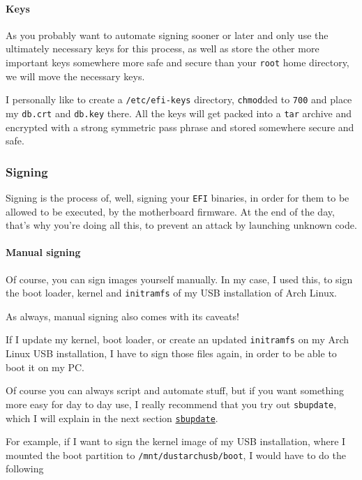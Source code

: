 \documentclass[9pt]{report}
\newenvironment{NOTE}
{\begin{tcolorbox}[colback=admonitionBG,coltitle=draculaFG,colframe=draculaBlue,colbacktitle=draculaBlue,title=NOTE]}
{\end{tcolorbox}}
\begin{document}
\newpage

\hypertarget{x-keys}{\paragraph{Keys}}
As you probably want to automate signing sooner or later and only use the ultimately necessary keys for this process, as well as store the other more important keys somewhere more safe and secure than your \texttt{root} home directory, we will move the necessary keys.


I personally like to create a \texttt{/etc/efi-keys} directory, \texttt{chmod}ded to \texttt{700} and place my \texttt{db.crt} and \texttt{db.key} there.
All the keys will get packed into a \texttt{tar} archive and encrypted with a strong symmetric pass phrase and stored somewhere secure and safe.



\newpage

\hypertarget{x-signing}{\subsubsection{Signing}}
Signing is the process of, well, signing your \texttt{EFI} binaries, in order for them to be allowed to be executed, by the motherboard firmware.
At the end of the day, that’s why you’re doing all this, to prevent an attack by launching unknown code.



\newpage

\hypertarget{x-manual-signing}{\paragraph{Manual signing}}
Of course, you can sign images yourself manually.
In my case, I used this, to sign the boot loader, kernel and \texttt{initramfs} of my USB installation of Arch Linux.


\begin{NOTE}
    As always, manual signing also comes with its caveats!


    If I update my kernel, boot loader, or create an updated \texttt{initramfs} on my Arch Linux USB installation, I have to sign those files again, in order to be able to boot it on my PC.


    Of course you can always script and automate stuff, but if you want something more easy for day to day use, I really recommend that you try out \texttt{sbupdate},  which I will explain in the next section \hyperlink{sbupdate}{\texttt{sbupdate}}.

\end{NOTE}
For example, if I want to sign the kernel image of my USB installation, where I mounted the boot partition to \texttt{/mnt/dustarchusb/boot}, I would have to do the following
\end{document}

